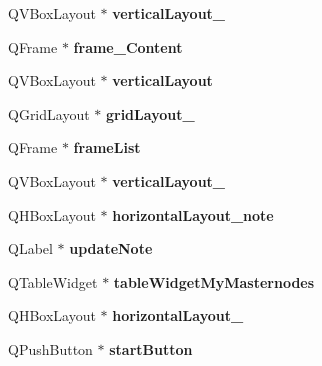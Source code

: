\begin{DoxyCompactItemize}
Q\+V\+Box\+Layout $\ast$ {\bfseries vertical\+Layout\+\_}
\item 
\mbox{\label{class_ui___masternode_list_a2967b91fbfbec64bbc5fb368c7b1608c}} 
Q\+Frame $\ast$ {\bfseries frame\+\_\+\+Content}
\item 
\mbox{\label{class_ui___masternode_list_a9d83472699bcd7718a263561f3e6597e}} 
Q\+V\+Box\+Layout $\ast$ {\bfseries vertical\+Layout}
\item 
\mbox{\label{class_ui___masternode_list_afedace68050f5eabf78cff06f028e8b2}} 
Q\+Grid\+Layout $\ast$ {\bfseries grid\+Layout\+\_}
\item 
\mbox{\label{class_ui___masternode_list_aaf263e5946f1edaff46d17397bfdfda9}} 
Q\+Frame $\ast$ {\bfseries frame\+List}
\item 
\mbox{\label{class_ui___masternode_list_a1110190e9072215d2cb1614187bc4326}} 
Q\+V\+Box\+Layout $\ast$ {\bfseries vertical\+Layout\+\_}
\item 
\mbox{\label{class_ui___masternode_list_a3fc8ea52c6893c1fb9f562210fecf9ab}} 
Q\+H\+Box\+Layout $\ast$ {\bfseries horizontal\+Layout\+\_\+note}
\item 
\mbox{\label{class_ui___masternode_list_abb23002ec333e9df01ec4f0622a3c172}} 
Q\+Label $\ast$ {\bfseries update\+Note}
\item 
\mbox{\label{class_ui___masternode_list_adaa526db09750fb060e9aee9455803ff}} 
Q\+Table\+Widget $\ast$ {\bfseries table\+Widget\+My\+Masternodes}
\item 
\mbox{\label{class_ui___masternode_list_a5c0c5ee6829f9c39156cd6a0904b8639}} 
Q\+H\+Box\+Layout $\ast$ {\bfseries horizontal\+Layout\+\_}
\item 
\mbox{\label{class_ui___masternode_list_a22247e8ee1d51b187ebc8130af73ebc7}} 
Q\+Push\+Button $\ast$ {\bfseries start\+Button}
\item 

\end{DoxyCompactItemize}
